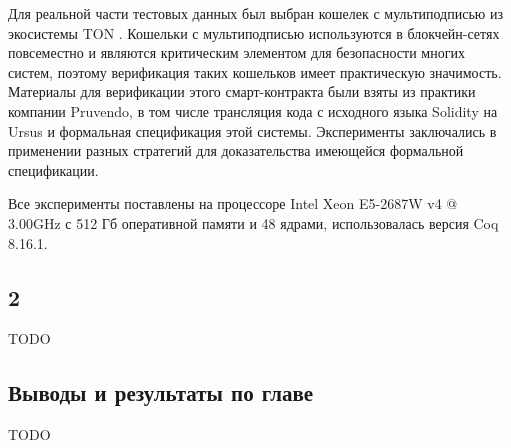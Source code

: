 \documentclass[../diploma.tex]{subfiles}
\begin{document}
Для реальной части тестовых данных был выбран кошелек с мультиподписью из экосистемы TON \cite{multisig}. Кошельки с мультиподписью используются в блокчейн-сетях повсеместно \cite{wallets_survey} и являются критическим элементом для безопасности многих систем, поэтому верификация таких кошельков имеет практическую значимость. Материалы для верификации этого смарт-контракта были взяты из практики компании Pruvendo, в том числе трансляция кода с исходного языка Solidity на Ursus и формальная спецификация этой системы. Эксперименты заключались в применении разных стратегий для доказательства имеющейся формальной спецификации.

Все эксперименты поставлены на процессоре Intel Xeon E5-2687W v4 @ 3.00GHz с 512 Гб оперативной памяти и 48 ядрами, использовалась версия Coq 8.16.1.

\subsection{2}

TODO

\subsection{Выводы и результаты по главе}

TODO
\end{document}
